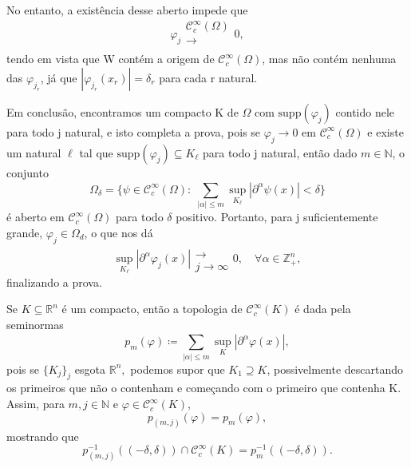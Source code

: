 \documentclass[../distribution_theory_notes.tex]{subfiles}
\begin{document}
\begin{proof*}
	No entanto, a existência desse aberto impede que
	\[
		\varphi_{j}\substack{\mathcal{C}_{c}^{\infty}(\Omega ) \\ \longrightarrow \\ }0,
	\]
	tendo em vista que W contém a origem de \(\mathcal{C}_{c}^{\infty}(\Omega )\), mas não contém nenhuma das \(\varphi_{j_r}\), já que \(|\varphi_{j_r}(x_{r})|=\delta_r\) para cada r natural.

	Em conclusão, encontramos um compacto K de \(\Omega \) com \(\mathrm{supp}(\varphi_{j})\) contido nele para todo j natural, e isto completa a prova, pois se \(\varphi_{j}\rightarrow 0\) em \(\mathcal{C}_{c}^{\infty}(\Omega )\) e existe um natural \(\ell \) tal que \(\mathrm{supp}(\varphi_{j})\subseteq K_{\ell}\) para todo j natural, então dado \(m\in \mathbb{N}\), o conjunto
	\[
		\Omega_{\delta }=\{\psi \in \mathcal{C}_{c}^{\infty}(\Omega ):\; \sum\limits_{|\alpha |\leq m}^{}\sup_{K_{\ell}}|\partial^{\alpha }\psi (x)|<\delta \}
	\]
	é aberto em \(\mathcal{C}_{c}^{\infty}(\Omega )\) para todo \(\delta \) positivo. Portanto, para j suficientemente grande, \(\varphi_{j}\in \Omega_d\), o que nos dá
	\[
		\sup_{K_{\ell}}| \partial ^{\alpha }\varphi_{j}(x)|\substack{ \\ \longrightarrow \\ j\to \infty}0, \quad \forall \alpha \in \mathbb{Z}_{+}^{n},
	\]
	finalizando a prova. \qedsymbol
\end{proof*}
\begin{tcolorbox}[
		skin=enhanced,
		title=Observação,
		fonttitle=\bfseries,
		colframe=black,
		colbacktitle=cyan!75!white,
		colback=cyan!15,
		colbacklower=black,
		coltitle=black,
		drop fuzzy shadow,
	]
	Se \(K\subseteq \mathbb{R}^{n}\) é um compacto, então a topologia de \(\mathcal{C}_{c}^{\infty}(K)\) é dada pela seminormas
	\[
		p_{m}(\varphi )\coloneqq \sum\limits_{|\alpha |\leq m}^{}\sup_{K} |\partial^{\alpha }\varphi (x)|,
	\]
	pois se \(\{K_{j}\}_{j}\) esgota \(\mathbb{R}^{n},\) podemos supor que \(K_1\supseteq K\), possivelmente descartando os primeiros que não o contenham e começando com o primeiro que contenha K. Assim, para \(m, j\in \mathbb{N}\) e \(\varphi \in \mathcal{C}_{c}^{\infty}(K)\),
	\[
		p_{(m, j)}(\varphi )=p_{m}(\varphi),
	\]
	mostrando que
	\[
		p_{(m, j)}^{-1}((-\delta, \delta ))\cap \mathcal{C}_{c}^{\infty}(K)=p_{m}^{-1}((-\delta , \delta )).
	\]
\end{tcolorbox}
\end{document}
